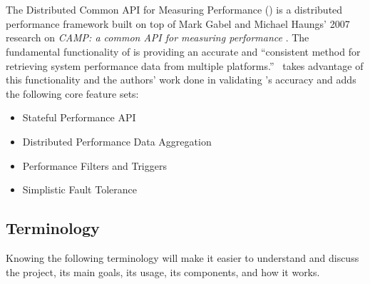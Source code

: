 \chapter{\dcamp}
\label{dcamp}

The Distributed Common API for Measuring Performance (\dcamp) is a distributed performance framework built on top of
Mark Gabel and Michael Haungs' 2007 research on \emph{CAMP: a common API for measuring performance} \cite{gabel2007}.
The fundamental functionality of \camp is providing an accurate and ``consistent method for retrieving system
performance data from multiple platforms.'' \dcamp\ takes advantage of this functionality and the authors' work done in
validating \camp's accuracy and adds the following core feature sets:

\begin{itemize}
\item Stateful Performance API
\item Distributed Performance Data Aggregation
\item Performance Filters and Triggers
\item Simplistic Fault Tolerance
\end{itemize}

\section{Terminology}
Knowing the following terminology will make it easier to understand and discuss the \dcamp project, its main goals, its
usage, its components, and how it works. 

